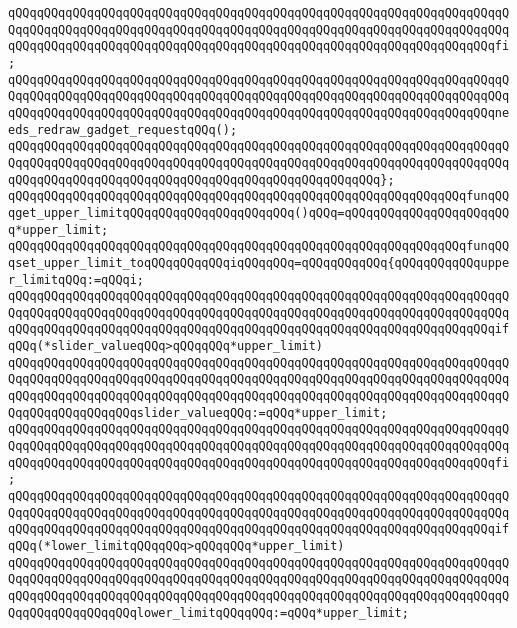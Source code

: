 \verb|qQQqqQQqqQQqqQQqqQQqqQQqqQQqqQQqqQQqqQQqqQQqqQQqqQQqqQQqqQQqqQQqqQQqqQQqqQQqqQQqqQQqqQQqqQQqqQQqqQQqqQQqqQQqqQQqqQQqqQQqqQQqqQQqqQQqqQQqqQQqqQQqqQQqqQQqqQQqqQQqqQQqqQQqqQQqqQQqqQQqqQQqqQQqqQQqqQQqqQQqqQQqqQQqfi;|\newline
\verb|qQQqqQQqqQQqqQQqqQQqqQQqqQQqqQQqqQQqqQQqqQQqqQQqqQQqqQQqqQQqqQQqqQQqqQQqqQQqqQQqqQQqqQQqqQQqqQQqqQQqqQQqqQQqqQQqqQQqqQQqqQQqqQQqqQQqqQQqqQQqqQQqqQQqqQQqqQQqqQQqqQQqqQQqqQQqqQQqqQQqqQQqqQQqqQQqqQQqqQQqqQQqqQQqneeds_redraw_gadget_requestqQQq();|\newline
\verb|qQQqqQQqqQQqqQQqqQQqqQQqqQQqqQQqqQQqqQQqqQQqqQQqqQQqqQQqqQQqqQQqqQQqqQQqqQQqqQQqqQQqqQQqqQQqqQQqqQQqqQQqqQQqqQQqqQQqqQQqqQQqqQQqqQQqqQQqqQQqqQQqqQQqqQQqqQQqqQQqqQQqqQQqqQQqqQQqqQQqqQQqqQQqqQQq};|\newline
\newline
\verb|qQQqqQQqqQQqqQQqqQQqqQQqqQQqqQQqqQQqqQQqqQQqqQQqqQQqqQQqqQQqqQQqfunqQQqget_upper_limitqQQqqQQqqQQqqQQqqQQqqQQq()qQQq=qQQqqQQqqQQqqQQqqQQqqQQq*upper_limit;|\newline
\verb|qQQqqQQqqQQqqQQqqQQqqQQqqQQqqQQqqQQqqQQqqQQqqQQqqQQqqQQqqQQqqQQqfunqQQqset_upper_limit_toqQQqqQQqqQQqiqQQqqQQq=qQQqqQQqqQQq{qQQqqQQqqQQqupper_limitqQQq:=qQQqi;|\newline
\verb|qQQqqQQqqQQqqQQqqQQqqQQqqQQqqQQqqQQqqQQqqQQqqQQqqQQqqQQqqQQqqQQqqQQqqQQqqQQqqQQqqQQqqQQqqQQqqQQqqQQqqQQqqQQqqQQqqQQqqQQqqQQqqQQqqQQqqQQqqQQqqQQqqQQqqQQqqQQqqQQqqQQqqQQqqQQqqQQqqQQqqQQqqQQqqQQqqQQqqQQqqQQqqQQqifqQQq(*slider_valueqQQq>qQQqqQQq*upper_limit)|\newline
\verb|qQQqqQQqqQQqqQQqqQQqqQQqqQQqqQQqqQQqqQQqqQQqqQQqqQQqqQQqqQQqqQQqqQQqqQQqqQQqqQQqqQQqqQQqqQQqqQQqqQQqqQQqqQQqqQQqqQQqqQQqqQQqqQQqqQQqqQQqqQQqqQQqqQQqqQQqqQQqqQQqqQQqqQQqqQQqqQQqqQQqqQQqqQQqqQQqqQQqqQQqqQQqqQQqqQQqqQQqqQQqqQQqqQQqslider_valueqQQq:=qQQq*upper_limit;|\newline
\verb|qQQqqQQqqQQqqQQqqQQqqQQqqQQqqQQqqQQqqQQqqQQqqQQqqQQqqQQqqQQqqQQqqQQqqQQqqQQqqQQqqQQqqQQqqQQqqQQqqQQqqQQqqQQqqQQqqQQqqQQqqQQqqQQqqQQqqQQqqQQqqQQqqQQqqQQqqQQqqQQqqQQqqQQqqQQqqQQqqQQqqQQqqQQqqQQqqQQqqQQqqQQqqQQqfi;|\newline
\verb|qQQqqQQqqQQqqQQqqQQqqQQqqQQqqQQqqQQqqQQqqQQqqQQqqQQqqQQqqQQqqQQqqQQqqQQqqQQqqQQqqQQqqQQqqQQqqQQqqQQqqQQqqQQqqQQqqQQqqQQqqQQqqQQqqQQqqQQqqQQqqQQqqQQqqQQqqQQqqQQqqQQqqQQqqQQqqQQqqQQqqQQqqQQqqQQqqQQqqQQqqQQqqQQqifqQQq(*lower_limitqQQqqQQq>qQQqqQQq*upper_limit)|\newline
\verb|qQQqqQQqqQQqqQQqqQQqqQQqqQQqqQQqqQQqqQQqqQQqqQQqqQQqqQQqqQQqqQQqqQQqqQQqqQQqqQQqqQQqqQQqqQQqqQQqqQQqqQQqqQQqqQQqqQQqqQQqqQQqqQQqqQQqqQQqqQQqqQQqqQQqqQQqqQQqqQQqqQQqqQQqqQQqqQQqqQQqqQQqqQQqqQQqqQQqqQQqqQQqqQQqqQQqqQQqqQQqqQQqqQQqlower_limitqQQqqQQq:=qQQq*upper_limit;|\newline
